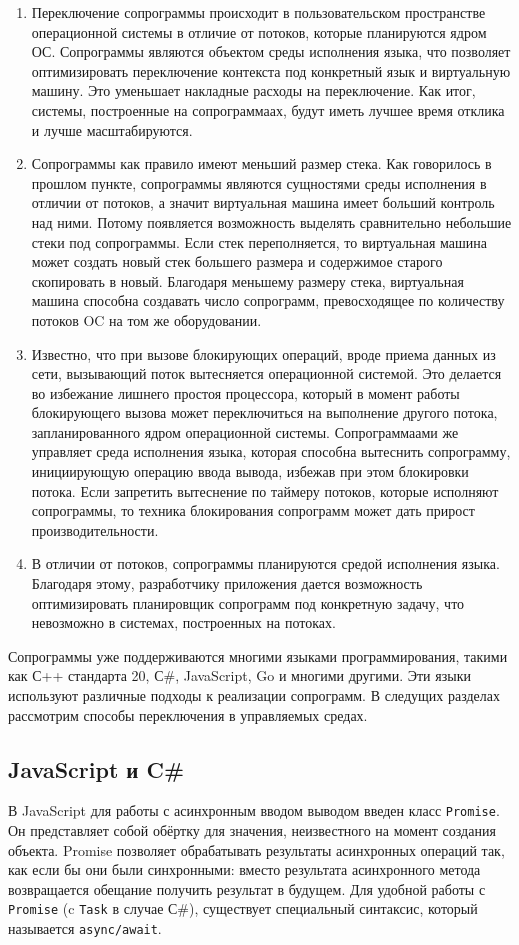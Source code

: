 	\begin{enumerate}
		\item Переключение сопрограммы происходит в пользовательском пространстве операционной системы в отличие от
		потоков, которые планируются ядром ОС. Сопрограммы являются объектом среды исполнения языка, что
		позволяет оптимизировать переключение контекста под конкретный язык и виртуальную машину. Это уменьшает
		накладные расходы на переключение. Как итог, системы, построенные на сопрограммаах, будут
		иметь лучшее время отклика и лучше масштабируются.
		\item Сопрограммы как правило имеют меньший размер стека. Как говорилось в прошлом пункте,
		сопрограммы являются сущностями среды исполнения в отличии от потоков, а значит виртуальная машина имеет больший
		контроль над ними. Потому появляется возможность выделять сравнительно небольшие стеки под сопрограммы. 
		Если стек переполняется, то виртуальная машина может создать новый стек большего размера и содержимое старого
		скопировать в новый. Благодаря меньшему размеру стека, виртуальная машина способна создавать число
		сопрограмм, превосходящее по количеству потоков OC на том же оборудовании.
		\item Известно, что при вызове блокирующих операций, вроде приема данных из сети, вызывающий поток вытесняется
		операционной системой\cite{linux-api}. Это делается во избежание лишнего простоя процессора, который в момент
		работы блокирующего вызова может переключиться на выполнение другого потока, запланированного ядром операционной
		системы. Сопрограммаами же управляет среда исполнения языка, которая способна вытеснить сопрограмму,
		инициирующую операцию ввода вывода, избежав при	этом блокировки потока. Если запретить
		вытеснение по таймеру потоков, которые исполняют сопрограммы, то техника блокирования сопрограмм
		может дать прирост производительности.
		\item В отличии от потоков, сопрограммы планируются средой исполнения языка. Благодаря этому, разработчику
		приложения дается возможность оптимизировать планировщик сопрограмм	под конкретную задачу, что невозможно в
		системах, построенных на потоках.
	\end{enumerate}
	Сопрограммы уже поддерживаются многими языками программирования, такими как С++ стандарта 20, С\#, JavaScript,
	Go и многими другими. Эти языки используют различные подходы к реализации сопрограмм. В следущих разделах 
	рассмотрим способы переключения в управляемых средах.
	\clearpage
	
	\subsection{JavaScript и C\#}
	В JavaScript для работы с асинхронным вводом выводом введен класс \texttt{Promise}.
	Он представляет собой обёртку для значения, неизвестного на момент создания объекта. 
	Promise позволяет обрабатывать результаты асинхронных операций так, как если бы они были синхронными:
	вместо результата асинхронного метода возвращается обещание получить результат в будущем.
	Для удобной работы с \texttt{Promise} (c \texttt{Task} в случае С\#), существует специальный синтаксис, 
	который называется \texttt{async/await}. 
	
